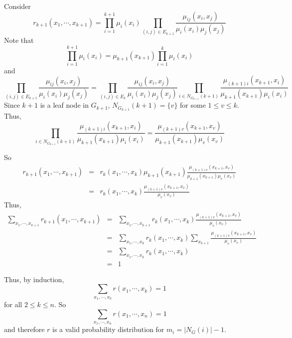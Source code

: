 \documentclass{article}
\begin{document}
\begin{enumerate}
	Consider 
	\begin{equation}
		r_{k + 1}(x_1,\cdots,x_{k + 1}) = \prod_{i = 1}^{k + 1} \mu_i(x_i) \prod_{(i, j) \in E_{k + 1}} \frac{\mu_{ij}(x_i, x_j)}{\mu_i(x_i)\mu_j(x_j)}
	\end{equation}
	Note that 
	\begin{equation}
		 \prod_{i = 1}^{k + 1} \mu_i(x_i) =  \mu_{k+1}(x_{k +1})\prod_{i = 1}^{k} \mu_i(x_i)
	\end{equation}
	and 
	\begin{equation}
		\prod_{(i, j) \in E_{k + 1}} \frac{\mu_{ij}(x_i, x_j)}{\mu_i(x_i)\mu_j(x_j)} = \prod_{(i, j) \in E_{k}} \frac{\mu_{ij}(x_i, x_j)}{\mu_i(x_i)\mu_j(x_j)}\prod_{i \in N_{G_{k + 1}}(k+1)}\frac{\mu_{(k+1)i}(x_{k+1}, x_i)}{\mu_{k+1}(x_{k + 1})\mu_i(x_i)} 
	\end{equation}
	Since $k + 1$ is a leaf node in $G_{k+1}$, $N_{G_{k + 1}}(k + 1) = \{v\}$ for some $1 \leq v \leq k $. Thus,
	\begin{equation}
	\prod_{i \in N_{G_{k + 1}}(k+1)}\frac{\mu_{(k+1)i}(x_{k+1}, x_i)}{\mu_{k+1}(x_{k + 1})\mu_i(x_i)} = \frac{\mu_{(k+1)v}(x_{k+1}, x_v)}{\mu_{k+1}(x_{k + 1})\mu_v(x_v)}
	\end{equation}

	So 
	\begin{equation}
		\begin{aligned}
		r_{k + 1}(x_1,\cdots,x_{k + 1}) & = & r_{k}(x_1,\cdots,x_{k})\mu_{k+1}(x_{k +1})\frac{\mu_{(k+1)v}(x_{k+1}, x_v)}{\mu_{k+1}(x_{k + 1})\mu_v(x_v)} \\
		& = & r_{k}(x_1,\cdots,x_{k})\frac{\mu_{(k+1)v}(x_{k+1}, x_v)}{\mu_v(x_v)}
		\end{aligned}
	\end{equation}
	Thus, 
	\begin{equation}
	\begin{aligned}
		\sum_{x_1,\cdots,x_{k+1}}r_{k + 1}(x_1,\cdots,x_{k + 1}) & = & \sum_{x_1,\cdots,x_{k+1}} r_{k}(x_1,\cdots,x_{k})\frac{\mu_{(k+1)v}(x_{k+1}, x_v)}{\mu_v(x_v)} \\
		& = &\sum_{x_1,\cdots,x_{k}} r_{k}(x_1,\cdots,x_{k})\sum_{x_{k+1}}\frac{\mu_{(k+1)v}(x_{k+1}, x_v)}{\mu_v(x_v)} \\
		& = &\sum_{x_1,\cdots,x_{k}} r_{k}(x_1,\cdots,x_{k}) \\
		& = & 1
	\end{aligned}
	\end{equation}

	Thus, by induction, 
	\begin{equation}
		\sum_{x_1,\cdots,x_k} r(x_1,\cdots,x_k) = 1
	\end{equation}
	for all $2 \leq k \leq n$.
	So 
	\begin{equation}
		\sum_{x_1,\cdots,x_n} r(x_1,\cdots,x_n) = 1
	\end{equation}
	and therefore $r$ is a valid probability distribution for $m_i = |N_G(i)| - 1$.
\end{enumerate}
\end{document}

